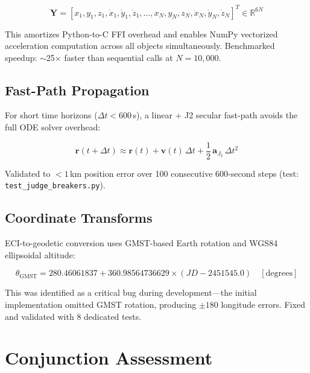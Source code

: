 \documentclass[11pt,a4paper]{article}
\begin{document}
\begin{equation}
\mathbf{Y} = [x_1, y_1, z_1, \dot{x}_1, \dot{y}_1, \dot{z}_1, \ldots, x_N, y_N, z_N, \dot{x}_N, \dot{y}_N, \dot{z}_N]^T \in \mathbb{R}^{6N}
\end{equation}

This amortizes Python-to-C FFI overhead and enables NumPy vectorized
acceleration computation across all objects simultaneously. Benchmarked
speedup: $\sim$25$\times$ faster than sequential calls at $N = 10{,}000$.

\subsection{Fast-Path Propagation}

For short time horizons ($\Delta t < 600$\,s), a linear + J2 secular
fast-path avoids the full ODE solver overhead:

\begin{equation}
\mathbf{r}(t + \Delta t) \approx \mathbf{r}(t) + \mathbf{v}(t)\,\Delta t + \frac{1}{2}\,\mathbf{a}_{J_2}\,\Delta t^2
\end{equation}

Validated to $< 1$\,km position error over 100 consecutive 600-second steps
(test: \texttt{test\_judge\_breakers.py}).

\subsection{Coordinate Transforms}

ECI-to-geodetic conversion uses GMST-based Earth rotation and WGS84
ellipsoidal altitude:

\begin{equation}
\theta_\text{GMST} = 280.46061837 + 360.98564736629 \times (JD - 2451545.0) \quad [\text{degrees}]
\end{equation}

This was identified as a critical bug during development---the initial
implementation omitted GMST rotation, producing $\pm 180$\textdegree{}
longitude errors. Fixed and validated with 8 dedicated tests.

\section{Conjunction Assessment}
\end{document}
